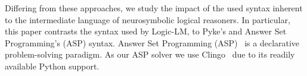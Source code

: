 Differing from these approaches,
we study the impact of the used syntax inherent to the intermediate language of 
neurosymbolic logical reasoners.
In particular, this paper contrasts the syntax used by Logic-LM, to Pyke's
and Answer Set Programming's (ASP) syntax.
Answer Set Programming (ASP)~\citep{gelfond_logic_2002} is a declarative problem-solving paradigm.
As our ASP solver we use Clingo~\citep{kaminski_how_2023} due to its
readily available Python support.
%